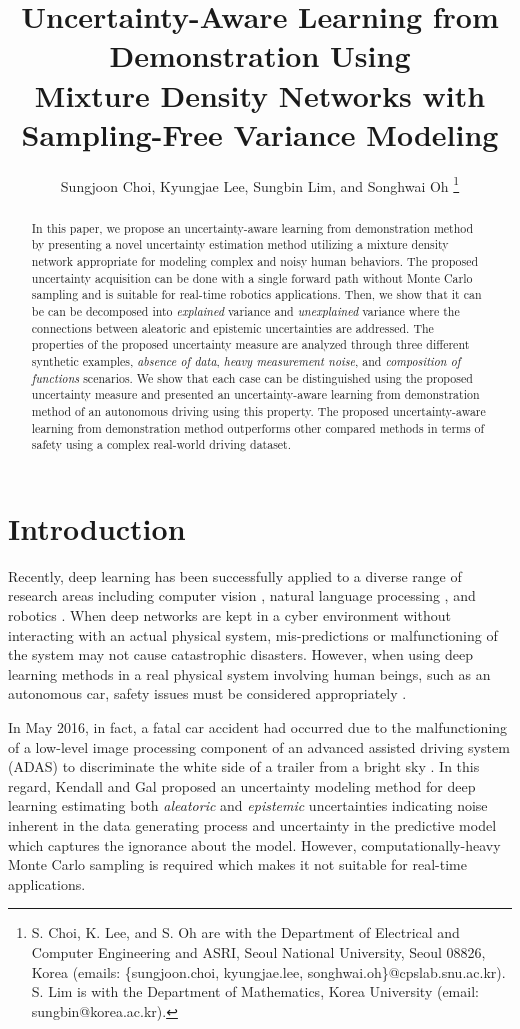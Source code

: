 \documentclass[letterpaper, 10 pt, conference]{ieeeconf}  %
\title{
\bf
Uncertainty-Aware Learning from Demonstration Using \\
Mixture Density Networks with Sampling-Free Variance Modeling
}
\author{Sungjoon Choi, Kyungjae Lee, Sungbin Lim, and Songhwai Oh
\thanks{
S. Choi, K. Lee, and S. Oh are with the Department of
Electrical and Computer Engineering and ASRI, 
Seoul National University, Seoul 08826, Korea
(emails: \{sungjoon.choi, kyungjae.lee,
songhwai.oh\}@cpslab.snu.ac.kr).
S. Lim is with the Department of Mathematics,
Korea University (email: sungbin@korea.ac.kr).
}%
}
\begin{document}
\maketitle %


\begin{abstract}
In this paper, we propose an uncertainty-aware
learning from demonstration method by presenting
a novel uncertainty estimation method utilizing
a mixture density network appropriate for
modeling complex and noisy human behaviors.
The proposed uncertainty acquisition can be
done with a single forward path without Monte Carlo sampling
and is suitable for real-time robotics applications.
Then, we show that it can be can be decomposed into 
\textit{explained} variance and \textit{unexplained} variance
where the connections between aleatoric and epistemic
uncertainties are addressed.
The properties of the proposed uncertainty measure are
analyzed through three different synthetic examples, 
\textit{absence of data}, \textit{heavy measurement noise}, 
and \textit{composition of functions} scenarios.
We show that each case can be distinguished using 
the proposed uncertainty measure and 
presented 
an uncertainty-aware learning from demonstration method
of an autonomous driving
using this property. 
The proposed uncertainty-aware learning from demonstration
method outperforms other compared methods in terms of
safety using a complex real-world driving dataset.
\end{abstract}
\IEEEpeerreviewmaketitle


\section{Introduction}


Recently, deep learning has been successfully applied
to a diverse range of research areas 
including computer vision \cite{He_16},
natural language processing \cite{Collobert_08}, 
and robotics \cite{Schulman_15}.
When deep networks are kept in a cyber environment
without interacting with an actual physical system,
mis-predictions or malfunctioning of the system
may not cause catastrophic disasters.
However, when using deep learning methods 
in a real physical system involving human beings, 
such as an autonomous car,
safety issues must be considered appropriately \cite{Amodei_16}. 

In May 2016, in fact, a fatal car accident had occurred 
due to the malfunctioning of a low-level image processing component
of an advanced assisted driving system (ADAS)
to discriminate the white side of a trailer from a bright sky
\cite{Tesla_16}.
In this regard, Kendall and Gal \cite{Kendall_17} 
proposed an uncertainty modeling method for deep learning
estimating both 
\textit{aleatoric} and \textit{epistemic} uncertainties indicating
noise inherent in the data generating process
and uncertainty in the predictive model
which captures the ignorance about the model. 
However, computationally-heavy Monte Carlo sampling is
required which makes it not suitable for real-time applications. 
\end{document}

